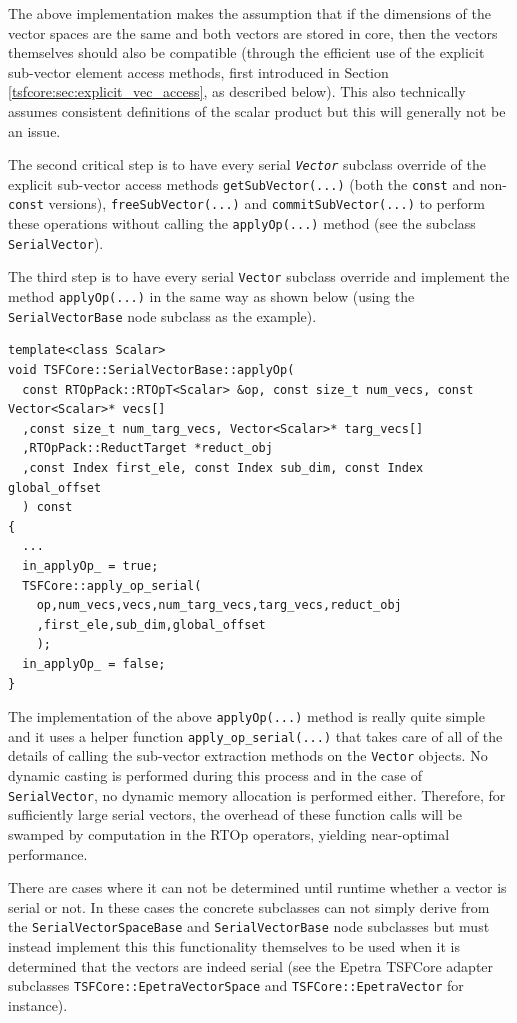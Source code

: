 {}\noindent{}The above implementation makes the assumption that if the dimensions
of the vector spaces are the same and both vectors are stored in core,
then the vectors themselves should also be compatible (through the
efficient use of the explicit sub-vector element access methods,
first introduced in Section \ref{tsfcore:sec:explicit_vec_access}, as
described below).  This also technically assumes consistent
definitions of the scalar product but this will generally not be an
issue.

The second critical step is to have every serial
\texttt{\textit{Vector}} subclass override of the explicit sub-vector
access methods \texttt{getSubVector(...)} (both the \texttt{const} and
non-\texttt{const} versions), \texttt{free\-Sub\-Vector(...)} and
\texttt{commit\-Sub\-Vector(...)} to perform these operations without
calling the \texttt{applyOp(\-...)} method (see the subclass
\texttt{SerialVector}).

The third step is to have every serial \texttt{Vector} subclass
override and implement the method \texttt{applyOp(\-...)} in the
same way as shown below (using the \texttt{SerialVectorBase} node
subclass as the example).

{\scriptsize\begin{verbatim}
template<class Scalar>
void TSFCore::SerialVectorBase::applyOp(
  const RTOpPack::RTOpT<Scalar> &op, const size_t num_vecs, const Vector<Scalar>* vecs[]
  ,const size_t num_targ_vecs, Vector<Scalar>* targ_vecs[]
  ,RTOpPack::ReductTarget *reduct_obj
  ,const Index first_ele, const Index sub_dim, const Index global_offset
  ) const
{
  ...
  in_applyOp_ = true;
  TSFCore::apply_op_serial(
    op,num_vecs,vecs,num_targ_vecs,targ_vecs,reduct_obj
    ,first_ele,sub_dim,global_offset
    );
  in_applyOp_ = false;
}
\end{verbatim}}

{}\noindent{}The implementation of the above \texttt{applyOp(\-...)}
method is really quite simple and it uses a helper function
{}\texttt{apply\_op\_serial(...)}  that takes care of all of the
details of calling the sub-vector extraction methods on the
\texttt{Vector} objects.  No dynamic casting is performed during this
process and in the case of \texttt{SerialVector}, no dynamic memory
allocation is performed either.  Therefore, for sufficiently large
serial vectors, the overhead of these function calls will be swamped
by computation in the RTOp operators, yielding near-optimal
performance.

There are cases where it can not be determined until runtime whether a
vector is serial or not.  In these cases the concrete subclasses can
not simply derive from the \texttt{Serial\-VectorSpace\-Base} and
\texttt{SerialVectorBase} node subclasses but must instead implement
this this functionality themselves to be used when it is determined
that the vectors are indeed serial (see the Epetra TSFCore adapter
subclasses \texttt{TSFCore::EpetraVectorSpace} and
\texttt{TSFCore::EpetraVector} for instance).

